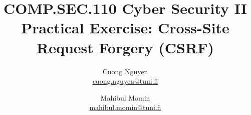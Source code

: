 \documentclass{article}
\title{COMP.SEC.110 Cyber Security II
    \large Practical Exercise: Cross-Site Request Forgery (CSRF)
}
\author{Cuong Nguyen\\ \href{mailto:cuong.nguyen@tuni.fi}{cuong.nguyen@tuni.fi} 
        \and Mahibul Momin\\ \href{mailto:mahibul.momin@tuni.fi}{mahibul.momin@tuni.fi}
}
\begin{document}
    
\maketitle
\tableofcontents
\newpage

\listoffigures
\newpage

% 
% 







\printbibliography{}
\end{document}
